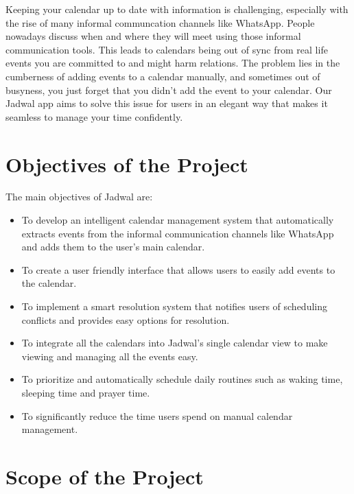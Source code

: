 \documentclass[12pt,a4paper]{report}
\begin{document}
Keeping your calendar up to date with information is challenging, especially with the rise of many informal communcation channels like WhatsApp. People nowadays discuss when and where they will meet using those informal communication tools. This leads to calendars being out of sync from real life events you are committed to and might harm relations. The problem lies in the cumberness of adding events to a calendar manually, and sometimes out of busyness, you just forget that you didn't add the event to your calendar. Our Jadwal app aims to solve this issue for users in an elegant way that makes it seamless to manage your time confidently.

\section{Objectives of the Project}

The main objectives of Jadwal are:
\begin{itemize}
    \item To develop an intelligent calendar management system that automatically extracts events from the informal communication channels like WhatsApp and adds them to the user's main calendar.
    \item To create a user friendly interface that allows users to easily add events to the calendar.
    \item To implement a smart resolution system that notifies users of scheduling conflicts and provides easy options for resolution.
    \item To integrate all the calendars into Jadwal's single calendar view to make viewing and managing all the events easy.
    \item To prioritize and automatically schedule daily routines such as waking time, sleeping time and prayer time.
    \item To significantly reduce the time users spend on manual calendar management.
\end{itemize}

\section{Scope of the Project}
\end{document}

